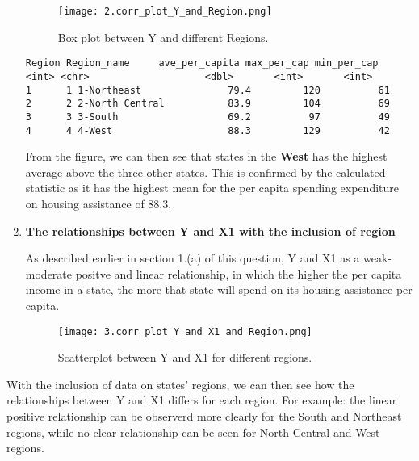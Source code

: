 \documentclass[12pt,letterpaper]{article}
\begin{document}
\begin{enumerate}
	\begin{figure}[H]\centering
		\caption{\footnotesize Box plot between Y and different Regions.}
		\label{fig:plot_1}
		\texttt{[image: 2.corr\_plot\_Y\_and\_Region.png]}
	\end{figure}
		
	\begin{verbatim}
Region Region_name     ave_per_capita max_per_cap min_per_cap
<int> <chr>                    <dbl>       <int>       <int>
1      1 1-Northeast               79.4         120          61
2      2 2-North Central           83.9         104          69
3      3 3-South                   69.2          97          49
4      4 4-West                    88.3         129          42
	\end{verbatim}
	From the figure, we can then see that states in the \textbf{West} has the highest average above the three other states. This is confirmed by the calculated statistic as it has the highest mean for the per capita spending expenditure on housing assistance of 88.3.
	
	\vspace{1cm}
	
	\item \textbf{The relationships between Y and X1 with the inclusion of region}
		
	As described earlier in section 1.(a) of this question, Y and X1 as a weak-moderate positve and linear relationship, in which the higher the per capita income in a state, the more that state will spend on its housing assistance per capita. 
	\begin{figure}[H]\centering
		\caption{\footnotesize Scatterplot between Y and X1 for different regions.}
		\label{fig:plot_1}
		\texttt{[image: 3.corr\_plot\_Y\_and\_X1\_and\_Region.png]}
	\end{figure}
\end{enumerate} 
	With the inclusion of data on states' regions, we can then see how the relationships between Y and X1 differs for each region. For example: the linear positive relationship can be observerd more clearly for the South and Northeast regions, while no clear relationship can be seen for North Central and West regions. 
\end{document}
